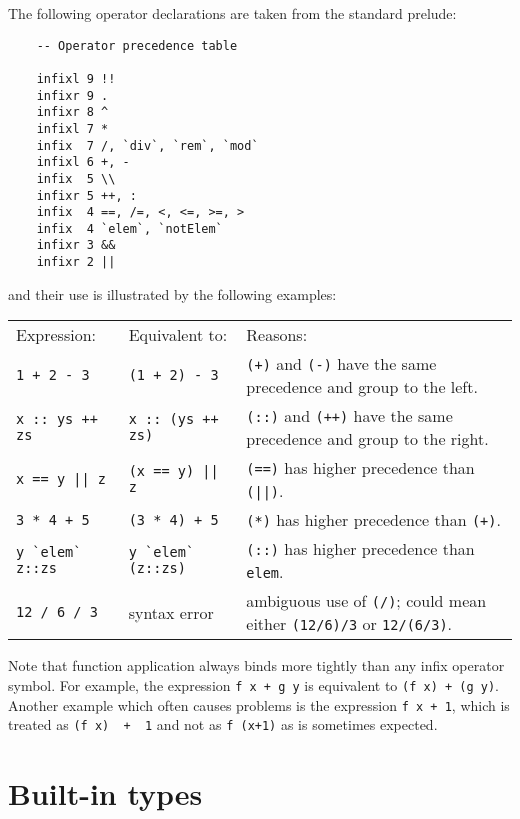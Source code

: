The following operator declarations are taken from the standard prelude:
\begin{verbatim}
    -- Operator precedence table

    infixl 9 !!
    infixr 9 .
    infixr 8 ^
    infixl 7 *
    infix  7 /, `div`, `rem`, `mod`
    infixl 6 +, -
    infix  5 \\
    infixr 5 ++, :
    infix  4 ==, /=, <, <=, >=, >
    infix  4 `elem`, `notElem`
    infixr 3 &&
    infixr 2 ||
\end{verbatim}
and their use is illustrated by the following examples:
\BQ
\begin{tabular}{llp{6cm}}
 Expression: &    Equivalent to: &  Reasons:   \\
 \verb"1 + 2 - 3" & \verb"(1 + 2) - 3"  &  \verb"(+)" and \verb"(-)"
                                           have the same  precedence
                                           and group to the left. \\
 \verb"x :: ys ++ zs" &  \verb"x :: (ys ++ zs)" &   \verb"(::)" and 
                                           \verb"(++)" have the same precedence
                                           and group to the right.\\
 \verb"x == y || z" & \verb"(x == y) || z" &    \verb"(==)" has higher
                                            precedence than \verb"(||)".\\
 \verb"3 * 4 + 5" & \verb"(3 * 4) + 5" &   \verb"(*)" has higher 
                                           precedence than \verb"(+)".\\
 \verb"y `elem` z::zs" & \verb"y `elem` (z::zs)" & \verb"(::)"  has higher 
                                          precedence than \verb"elem". \\
 \verb"12 / 6 / 3" & syntax error &    ambiguous  use  of  \verb"(/)";
                                      could  mean
                                  either \verb"(12/6)/3" or \verb"12/(6/3)".
\end{tabular}
\EQ
Note that function application always binds more tightly than any infix
operator symbol.  For example, the expression \verb"f x + g y" is equivalent
to \verb"(f x) + (g y)".  Another example which often causes problems is the
expression  \verb"f x + 1", 
which is treated as \verb"(f x)  +  1"  and  not  as
\verb"f (x+1)" as is sometimes expected.


\chapter{Built-in types}

